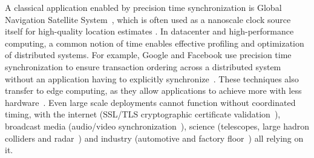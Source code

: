 A classical application enabled by precision time synchronization
is Global Navigation Satellite System~\cite{intro-to-gnss},
which is often used as a nanoscale clock source itself for high-quality location estimates
\cite{gnss-location-and-time-advances,gnss-for-high-precision-timing}.
%
%
In datacenter and high-performance computing,
a common notion of time enables effective profiling and optimization of distributed systems.
For example, Google and Facebook use precision time synchronization to ensure transaction ordering across a distributed system without an application having to explicitly synchronize~\cite{corbett2013spanner,li2020sundial,ouellete2023precision}.
These techniques also transfer to edge computing, as they allow applications to achieve more with less hardware~\cite{chen2021achieving, wang2019frame}.
Even large scale deployments cannot function without coordinated timing, with the internet (SSL/TLS cryptographic certificate validation~\cite{ssl-client-warnings}), broadcast media (audio/video synchronization~\cite{time-synchronization-for-multimedia}), science (telescopes, large hadron colliders and radar~\cite{white-rabbit-astrophysics,white-rabbit-at-cern, time-synchronization-radar}) and industry (automotive and factory floor~\cite{time-synchronization-automotive,time-synchronization-factory-floor}) all relying on it.

